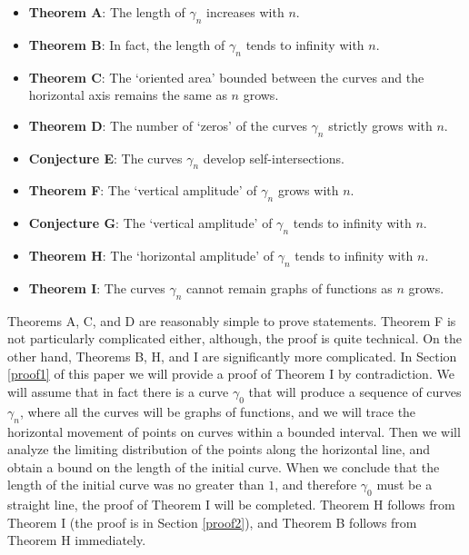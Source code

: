 \documentclass{article}
\theoremstyle{definition}
\begin{document}
\begin{itemize}
    \item 
        \textbf{Theorem A}: The length of $\gamma_n$ increases with $n$.\\

    \item 
        \textbf{Theorem B}: In fact, the length of $\gamma_n$ tends to infinity with $n$.\\

    \item 
        \textbf{Theorem C}: The `oriented area' bounded between the curves and the horizontal axis remains the same as $n$ grows.\\
        
    \item 
        \textbf{Theorem D}: The number of `zeros' of the curves $\gamma_n$ strictly grows with $n$.\\

    \item 
        \textbf{Conjecture E}: The curves $\gamma_n$ develop self-intersections.\\

    \item
        \textbf{Theorem F}: The `vertical amplitude' of $\gamma_n$ grows with $n$.\\

    \item 
        \textbf{Conjecture G}: The `vertical amplitude' of $\gamma_n$ tends to infinity with $n$.\\

    \item 
        \textbf{Theorem H}: The `horizontal amplitude' of $\gamma_n$ tends to infinity with $n$.\\

    \item
        \textbf{Theorem I}: The curves $\gamma_n$ cannot remain graphs of functions as $n$ grows.
\end{itemize}

Theorems A, C, and D are reasonably simple to prove statements. Theorem F is not particularly complicated either, although, the proof is quite technical. On the other hand, Theorems B, H, and I are significantly more complicated. In Section \ref{proof1} of this paper we will provide a proof of Theorem I by contradiction. We will assume that in fact there is a curve $\gamma_0$ that will produce a sequence of curves $\gamma_n$, where all the curves will be graphs of functions, and we will trace the horizontal movement of points on curves within a bounded interval. Then we will analyze the limiting distribution of the points along the horizontal line, and obtain a bound on the length of the initial curve. When we conclude that the length of the initial curve was no greater than $1$, and therefore $\gamma_0$ must be a straight line, the proof of Theorem I will be completed. Theorem H follows from Theorem I (the proof is in Section \ref{proof2}), and Theorem B follows from Theorem H immediately.
\end{document}
